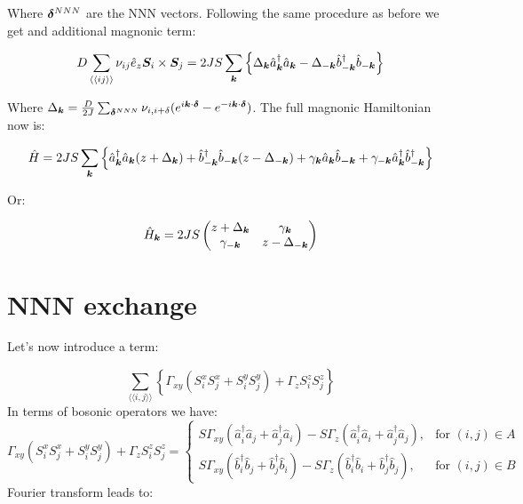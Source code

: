 Where $\boldsymbol{\delta}^{NNN}$ are the NNN vectors. Following the same procedure as before we get and additional magnonic term:

\begin{equation}
D \sum_{\langle \langle i j \rangle \rangle} \nu_{ij}\hat{e}_z \boldsymbol{S}_i \times \boldsymbol{S}_j = 2JS\sum_{\boldsymbol{k}} \left\{ \Delta_{\boldsymbol{k}}\hat{a}^\dagger_{\boldsymbol{k}}\hat{a}_{\boldsymbol{k}} - \Delta_{-\boldsymbol{k}}\hat{b}^\dagger_{-\boldsymbol{k}}\hat{b}_{-\boldsymbol{k}} \right\}
\end{equation}

Where $\Delta_{\boldsymbol{k}} = \frac{D}{2J}\sum_{\boldsymbol{\delta}^{NNN}} \nu_{i,i+\delta} (e^{i\boldsymbol{k}\cdot\boldsymbol{\delta}} -e^{-i\boldsymbol{k}\cdot\boldsymbol{\delta}})$. The full magnonic Hamiltonian now is:

\begin{equation}
\label{MagnonicH2}
\hat{H} = 2JS \sum_{\boldsymbol{k}} \left\{ \hat{a}^\dagger_{\boldsymbol{k}}\hat{a}_{\boldsymbol{k}}(z+\Delta_{\boldsymbol{k}}) + \hat{b}^\dagger_{-\boldsymbol{k}}\hat{b}_{-\boldsymbol{k}}(z-\Delta_{-\boldsymbol{k}}) + \gamma_{\boldsymbol{k}}\hat{a}_{\boldsymbol{k}}\hat{b}_{\boldsymbol{-k}} + \gamma_{-\boldsymbol{k}}\hat{a}^\dagger_{\boldsymbol{k}}\hat{b}^\dagger_{-\boldsymbol{k}} \right\}
\end{equation}

Or:

\begin{equation}
\hat{H}_{\boldsymbol{k}} = 2JS\begin{pmatrix} 
z + \Delta_{\boldsymbol{k}}& \gamma_{\boldsymbol{k}} \\
\gamma_{-\boldsymbol{k}} & z - \Delta_{-\boldsymbol{k}}
\end{pmatrix}
\end{equation}

\section{NNN exchange}

Let's now introduce a term:

\begin{equation}
\sum_{\langle \langle i,j \rangle \rangle} \left\{ \Gamma_{xy}(S_i^xS_j^x + S_i^yS_j^y) + \Gamma_zS_i^zS_j^z\right\}
\end{equation}
In terms of bosonic operators we have:
\begin{equation}
\Gamma_{xy}(S_i^xS_j^x + S_i^yS_j^y) + \Gamma_zS_i^zS_j^z = \begin{cases}
             S\Gamma_{xy}(\hat{a}_i^\dagger\hat{a}_j+\hat{a}_j^\dagger\hat{a}_i) - S\Gamma_z(\hat{a}_i^\dagger\hat{a}_i+\hat{a}_j^\dagger\hat{a}_j),  & \text{for } (i,j) \in A \\
             S\Gamma_{xy}(\hat{b}_i^\dagger\hat{b}_j+\hat{b}_j^\dagger\hat{b}_i) - S\Gamma_z(\hat{b}_i^\dagger\hat{b}_i+\hat{b}_j^\dagger\hat{b}_j),  & \text{for } (i,j) \in B
       \end{cases} \quad
\end{equation}
Fourier transform leads to:

